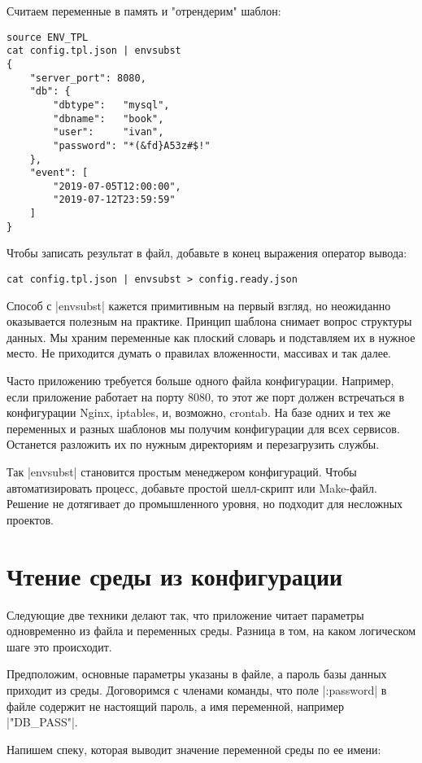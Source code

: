 Считаем переменные в память и "отрендерим" шаблон:

\begin{verbatim}
source ENV_TPL
cat config.tpl.json | envsubst
{
    "server_port": 8080,
    "db": {
        "dbtype":   "mysql",
        "dbname":   "book",
        "user":     "ivan",
        "password": "*(&fd}A53z#$!"
    },
    "event": [
        "2019-07-05T12:00:00",
        "2019-07-12T23:59:59"
    ]
}
\end{verbatim}

Чтобы записать результат в файл, добавьте в конец выражения оператор вывода:

\begin{verbatim}
cat config.tpl.json | envsubst > config.ready.json
\end{verbatim}

Способ с \spverb|envsubst| кажется примитивным на первый взгляд, но неожиданно
оказывается полезным на практике. Принцип шаблона снимает вопрос структуры
данных. Мы храним переменные как плоский словарь и подставляем их в нужное
место. Не приходится думать о правилах вложенности, массивах и так далее.

Часто приложению требуется больше одного файла конфигурации. Например, если
приложение работает на порту 8080, то этот же порт должен встречаться в
конфигурации Nginx, iptables, и, возможно, crontab. На базе одних и тех же
переменных и разных шаблонов мы получим конфигурации для всех
сервисов. Останется разложить их по нужным директориям и перезагрузить службы.

Так \spverb|envsubst| становится простым менеджером конфигураций. Чтобы
автоматизировать процесс, добавьте простой шелл-скрипт или Make-файл. Решение не
дотягивает до промышленного уровня, но подходит для несложных проектов.

\section{Чтение среды из конфигурации}

Следующие две техники делают так, что приложение читает параметры одновременно
из файла и переменных среды. Разница в том, на каком логическом шаге это
происходит.

Предположим, основные параметры указаны в файле, а пароль базы данных приходит
из среды. Договоримся с членами команды, что поле \spverb|:password| в файле содержит не
настоящий пароль, а имя переменной, например \spverb|"DB_PASS"|.

Напишем спеку, которая выводит значение переменной среды по ее имени:

